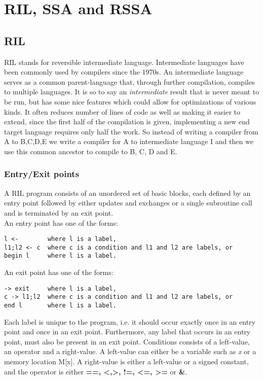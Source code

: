 \section{RIL, SSA and RSSA}
\label{section - RIL}
\subsection{RIL}
RIL stands for reversible intermediate language.
Intermediate languages have been commonly used by compilers since the 1970s.
An intermediate language serves as a common parent-language that, through further compilation, compiles to multiple languages. It is so to say an \emph{intermediate} result that is never meant to be run, but has some nice features which could allow for optimizations of various kinds. It often reduces number of lines of code as well as making it easier to extend, since the first half of the compilation is given, implementing a new end target language requires only half the work.
So instead of writing a compiler from A to B,C,D,E we write a compiler for A to intermediate language I and then we use this common ancestor to compile to B, C, D and E.
\subsubsection{Entry/Exit points}
A RIL program consists of an unordered set of basic blocks, each defined by an entry point followed by either updates and exchanges or a single subroutine call and is terminated by an exit point\cite{10.1007/978-3-319-41579-6_16}. \\
An entry point has one of the forms:
\begin{verbatim}
l <-        where l is a label,
l1;l2 <- c  where c is a condition and l1 and l2 are labels, or
begin l     where l is a label.
\end{verbatim}
An exit point has one of the forms:
\begin{verbatim}
-> exit     where l is a label,
c -> l1;l2  where c is a condition and l1 and l2 are labels, or
end l       where l is a label.
\end{verbatim}

Each label is unique to the program, i.e. it should occur exactly once in an entry point and once in an exit point.
Furthermore, any label that occurs in an entry point, must also be present in an exit point.
Conditions consists of a left-value, an operator and a right-value.
A left-value can either be a variable such as \emph{x} or a memory location M[x].
A right-value is either a left-value or a signed constant, and the operator is either \textbf{==, <,>, !=, <=, >=} or \textbf{\&}.

